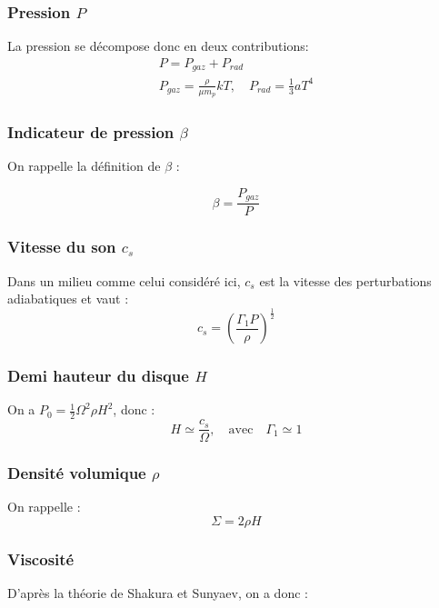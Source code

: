 \documentclass[a4paper,12pt]{article}
\begin{document}
\subsubsection{Pression $P$}
La pression se décompose donc en deux contributions:
\begin{gather}
    P=P_{gaz}+P_{rad}\\
    P_{gaz}=\frac{\rho}{\mu m_p}kT, \quad P_{rad}=\frac{1}{3}aT^4
\end{gather}

\subsubsection{Indicateur de pression $\beta$}
On rappelle la définition de $\beta$ : 

\begin{equation}
    \beta = \frac{P_{gaz}}{P}
\end{equation}

\subsubsection{Vitesse du son $c_s$}
Dans un milieu comme celui considéré ici, $c_s$ est la vitesse des perturbations adiabatiques et vaut :
\begin{equation}
    c_s = \left ( \frac{\Gamma_1 P}{\rho} \right )^{\frac{1}{2}}
\end{equation}

\subsubsection{Demi hauteur du disque $H$}
On a $P_0=\frac{1}{2}\Omega ^2 \rho H^2$, donc :
\begin{equation}
    H \simeq \frac{c_s}{\Omega}, \quad \text{avec} \quad \Gamma_1 \simeq 1
\end{equation}

\subsubsection{Densité volumique $\rho$}
On rappelle : 
\begin{equation}
    \Sigma = 2\rho H
\end{equation}

\subsubsection{Viscosité}
D'après la théorie de Shakura et Sunyaev, on a donc :
\end{document}
